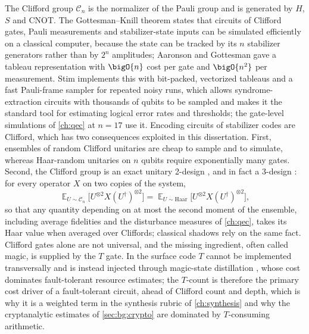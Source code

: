 The Clifford group $\mathcal{C}_n$ is the normalizer of the Pauli group and is generated by $H$, $S$ and CNOT. The Gottesman--Knill theorem states that circuits of Clifford gates, Pauli measurements and stabilizer-state inputs can be simulated efficiently on a classical computer, because the state can be tracked by its $n$ stabilizer generators rather than by $2^n$ amplitudes; Aaronson and Gottesman \cite{aaronson2004stabilizer} gave a tableau representation with $\bigO{n}$ cost per gate and $\bigO{n^2}$ per measurement. Stim \cite{gidney2021stim} implements this with bit-packed, vectorized tableaus and a fast Pauli-frame sampler for repeated noisy runs, which allows syndrome-extraction circuits with thousands of qubits to be sampled and makes it the standard tool for estimating logical error rates and thresholds; the gate-level simulations of \cref{ch:qec} at $n=17$ use it. Encoding circuits of stabilizer codes are Clifford, which has two consequences exploited in this dissertation. First, ensembles of random Clifford unitaries are cheap to sample and to simulate, whereas Haar-random unitaries on $n$ qubits require exponentially many gates. Second, the Clifford group is an exact unitary 2-design \cite{dankert2009designs}, and in fact a 3-design \cite{webb2016clifford3design}: for every operator $X$ on two copies of the system,
\begin{equation}\label{eq:bg:design}
\mathop{\mathbb{E}}_{U\sim\mathcal{C}_n}\bigl[U^{\otimes2}X(U^{\dagger})^{\otimes2}\bigr]=\mathop{\mathbb{E}}_{U\sim\mathrm{Haar}}\bigl[U^{\otimes2}X(U^{\dagger})^{\otimes2}\bigr],
\end{equation}
so that any quantity depending on at most the second moment of the ensemble, including average fidelities and the disturbance measures of \cref{ch:qec}, takes its Haar value when averaged over Cliffords; classical shadows \cite{huang2020shadows} rely on the same fact. Clifford gates alone are not universal, and the missing ingredient, often called magic, is supplied by the $T$ gate. In the surface code $T$ cannot be implemented transversally and is instead injected through magic-state distillation \cite{bravyi2005magic}, whose cost dominates fault-tolerant resource estimates; the $T$-count is therefore the primary cost driver of a fault-tolerant circuit, ahead of Clifford count and depth, which is why it is a weighted term in the synthesis rubric of \cref{ch:synthesis} \cite{guo2026rubriq} and why the cryptanalytic estimates of \cref{sec:bg:crypto} are dominated by $T$-consuming arithmetic.

